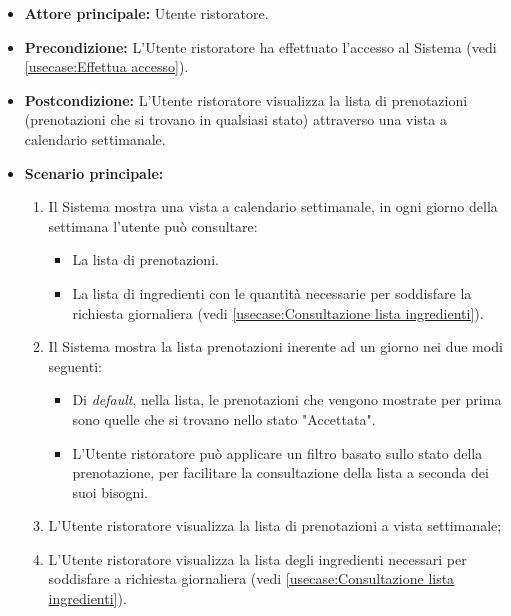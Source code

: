 \label{usecase:Consultazione lista prenotazioni}
\begin{itemize}
	\item \textbf{Attore principale:} Utente ristoratore.

	\item \textbf{Precondizione:} L'Utente ristoratore ha effettuato l'accesso al Sistema (vedi \autoref{usecase:Effettua accesso}).

	\item \textbf{Postcondizione:} L'Utente ristoratore visualizza la lista di prenotazioni (prenotazioni che si trovano in qualsiasi stato) attraverso una vista a calendario settimanale.

	\item \textbf{Scenario principale:}
	      \begin{enumerate}
		      \item Il Sistema mostra una vista a calendario settimanale, in ogni giorno della settimana l'utente può consultare:
		      \begin{itemize}
				\item La lista di prenotazioni.
				\item La lista di ingredienti con le quantità necessarie per soddisfare la richiesta giornaliera (vedi \autoref{usecase:Consultazione lista ingredienti}).
			  \end{itemize} 

		      \item Il Sistema mostra la lista prenotazioni inerente ad un giorno nei due modi seguenti:
		      \begin{itemize}
				\item Di \textit{default}, nella lista, le prenotazioni che vengono mostrate per prima sono quelle che si trovano nello stato "Accettata".
				\item L'Utente ristoratore può applicare un filtro basato sullo stato della prenotazione, per facilitare la consultazione della lista a seconda dei suoi bisogni.
			  \end{itemize}

		      \item L'Utente ristoratore visualizza la lista di prenotazioni a vista settimanale;

		      \item L'Utente ristoratore visualizza la lista degli ingredienti necessari per soddisfare a richiesta giornaliera (vedi \autoref{usecase:Consultazione lista ingredienti}).
	      \end{enumerate}
\end{itemize}


